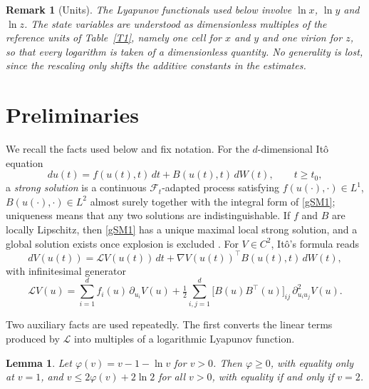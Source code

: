 \documentclass{article}
\newtheorem{lemma}{Lemma}[section]
\newtheorem{remark}{Remark}[section]
\begin{document}
\begin{remark}[Units]\label{rem:units}
The Lyapunov functionals used below involve $\ln x$, $\ln y$ and $\ln z$. The state variables are understood as dimensionless multiples of the reference units of Table~\ref{T1}, namely one cell for $x$ and $y$ and one virion for $z$, so that every logarithm is taken of a dimensionless quantity. No generality is lost, since the rescaling only shifts the additive constants in the estimates.
\end{remark}

\section{Preliminaries}\label{sec:prelim}

We recall the facts used below and fix notation. For the $d$-dimensional It\^o equation
\begin{equation}\label{gSM1}
du(t) = f(u(t),t)\,dt + B(u(t),t)\,dW(t), \qquad t \geq t_0,
\end{equation}
a \emph{strong solution} is a continuous $\mathcal{F}_t$-adapted process satisfying $f(u(\cdot),\cdot)\in L^1$, $B(u(\cdot),\cdot)\in L^2$ almost surely together with the integral form of \eqref{gSM1}; uniqueness means that any two solutions are indistinguishable. If $f$ and $B$ are locally Lipschitz, then \eqref{gSM1} has a unique maximal local strong solution, and a global solution exists once explosion is excluded \citep[Ch.~2]{Ref1}. For $V\in C^2$, It\^o's formula reads
\begin{equation}\label{ito_formula}
dV(u(t)) = \mathcal{L}V(u(t))\,dt + \nabla V(u(t))^\top B(u(t),t)\,dW(t),
\end{equation}
with infinitesimal generator
\begin{equation}\label{generator}
\mathcal{L}V(u) = \sum_{i=1}^d f_i(u)\,\partial_{u_i}V(u) + \tfrac{1}{2}\sum_{i,j=1}^d \big[B(u)B^\top(u)\big]_{ij}\,\partial^2_{u_iu_j}V(u).
\end{equation}

Two auxiliary facts are used repeatedly. The first converts the linear terms produced by $\mathcal{L}$ into multiples of a logarithmic Lyapunov function.

\begin{lemma}\label{lem1}
Let $\varphi(v)=v-1-\ln v$ for $v>0$. Then $\varphi\ge 0$, with equality only at $v=1$, and $v \le 2\varphi(v) + 2\ln 2$ for all $v>0$, with equality if and only if $v=2$.
\end{lemma}
\end{document}

